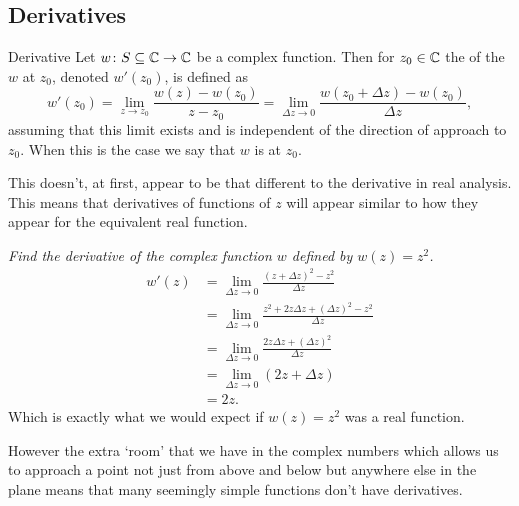\documentclass{article}
\begin{document}
    \subsection{Derivatives}
    \begin{definition}{Derivative}{}
        Let \(w\colon S\subseteq\mathbb{C}\to\mathbb{C}\) be a complex function.
        Then for \(z_0\in\mathbb{C}\) the  of the \(w\) at \(z_0\), denoted \(w'(z_0)\), is defined as
        \[w'(z_0) = \lim_{z\to z_0} \frac{w(z) - w(z_0)}{z - z_0} = \lim_{\Delta z \to 0} \frac{w(z_0 + \Delta z) - w(z_0)}{\Delta z},\]
        assuming that this limit exists and is independent of the direction of approach to \(z_0\).
        When this is the case we say that \(w\) is  at \(z_0\).
    \end{definition}
    This doesn't, at first, appear to be that different to the derivative in real analysis.
    This means that derivatives of functions of \(z\) will appear similar to how they appear for the equivalent real function.
    \begin{example}
        \textit{Find the derivative of the complex function \(w\) defined by \(w(z) = z^2\).}
        \begin{align*}
            w'(z) &= \lim_{\Delta z \to 0} \frac{(z + \Delta z)^2 - z^2}{\Delta z}\\
            &= \lim_{\Delta z\to 0} \frac{z^2 + 2z\Delta z + (\Delta z)^2 - z^2}{\Delta z}\\
            &= \lim_{\Delta z\to 0} \frac{2z\Delta z + (\Delta z)^2}{\Delta z}\\
            &= \lim_{\Delta z\to 0} (2z + \Delta z)\\
            &= 2z.
        \end{align*}
        Which is exactly what we would expect if \(w(z) = z^2\) was a real function.
    \end{example}
    However the extra `room' that we have in the complex numbers which allows us to approach a point not just from above and below but anywhere else in the plane means that many seemingly simple functions don't have derivatives.
\end{document}
